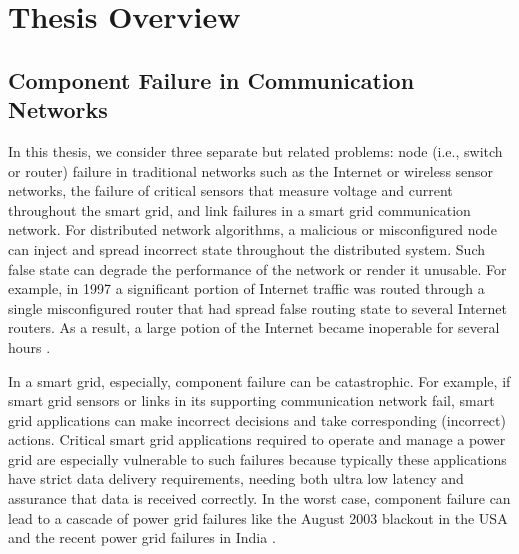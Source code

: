 \section{Thesis Overview}

\subsection{Component Failure in Communication Networks}

%



In this thesis, we consider three separate but related problems: node (i.e., switch or router) failure in traditional networks such as the Internet or wireless sensor networks,
the failure of critical sensors that measure voltage and current throughout the smart grid, and link failures in a smart grid communication network.
For distributed network algorithms, a malicious or misconfigured node can inject and spread incorrect state throughout the distributed system. 
Such false state can degrade the performance of the network or render it unusable. For example, in 1997 a significant portion of Internet traffic was routed through a 
single misconfigured router that had spread false routing state to several Internet routers.  As a result, a large potion of the Internet became inoperable for several hours \cite{Neumann97}. 


In a smart grid, especially, component failure can be catastrophic. 
For example, if smart grid sensors or links in its supporting communication network fail, smart grid applications can make incorrect decisions and take corresponding (incorrect) actions. 
Critical smart grid applications required to operate and manage a power grid are especially vulnerable to such failures because typically these applications have strict data delivery requirements,
needing both ultra low latency and assurance that data is received correctly. 
In the worst case, component failure can lead to a cascade of power grid failures like the August 2003 blackout in the USA \cite{2003Blackout} and the 
recent power grid failures in India \cite{IndiaBlackout}.






